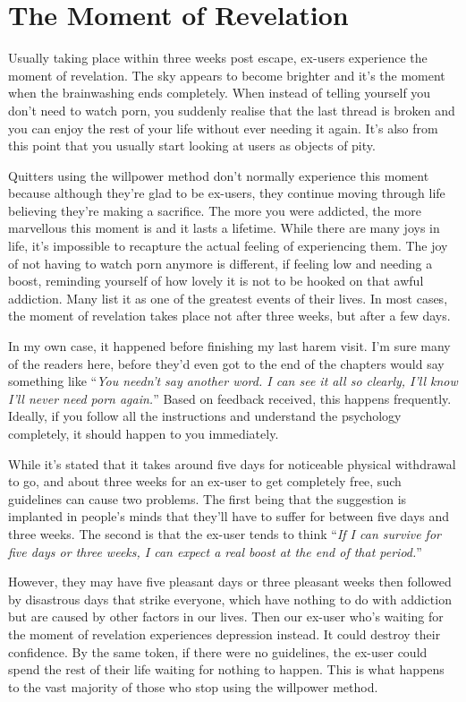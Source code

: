 \documentclass[
]{book}
\begin{document}
\hypertarget{the-moment-of-revelation}{%
\chapter{The Moment of Revelation}\label{the-moment-of-revelation}}

Usually taking place within three weeks post escape, ex-users experience the moment of revelation. The sky appears to become brighter and it's the moment when the brainwashing ends completely. When instead of telling yourself you don't need to watch porn, you suddenly realise that the last thread is broken and you can enjoy the rest of your life without ever needing it again. It's also from this point that you usually start looking at users as objects of pity.

Quitters using the willpower method don't normally experience this moment because although they're glad to be ex-users, they continue moving through life believing they're making a sacrifice. The more you were addicted, the more marvellous this moment is and it lasts a lifetime. While there are many joys in life, it's impossible to recapture the actual feeling of experiencing them. The joy of not having to watch porn anymore is different, if feeling low and needing a boost, reminding yourself of how lovely it is not to be hooked on that awful addiction. Many list it as one of the greatest events of their lives. In most cases, the moment of revelation takes place not after three weeks, but after a few days.

In my own case, it happened before finishing my last harem visit. I'm sure many of the readers here, before they'd even got to the end of the chapters would say something like ``\emph{You needn't say another word. I can see it all so clearly, I'll know I'll never need porn again.}'' Based on feedback received, this happens frequently. Ideally, if you follow all the instructions and understand the psychology completely, it should happen to you immediately.

While it's stated that it takes around five days for noticeable physical withdrawal to go, and about three weeks for an ex-user to get completely free, such guidelines can cause two problems. The first being that the suggestion is implanted in people's minds that they'll have to suffer for between five days and three weeks. The second is that the ex-user tends to think ``\emph{If I can survive for five days or three weeks, I can expect a real boost at the end of that period.}''

However, they may have five pleasant days or three pleasant weeks then followed by disastrous days that strike everyone, which have nothing to do with addiction but are caused by other factors in our lives. Then our ex-user who's waiting for the moment of revelation experiences depression instead. It could destroy their confidence. By the same token, if there were no guidelines, the ex-user could spend the rest of their life waiting for nothing to happen. This is what happens to the vast majority of those who stop using the willpower method.
\end{document}
